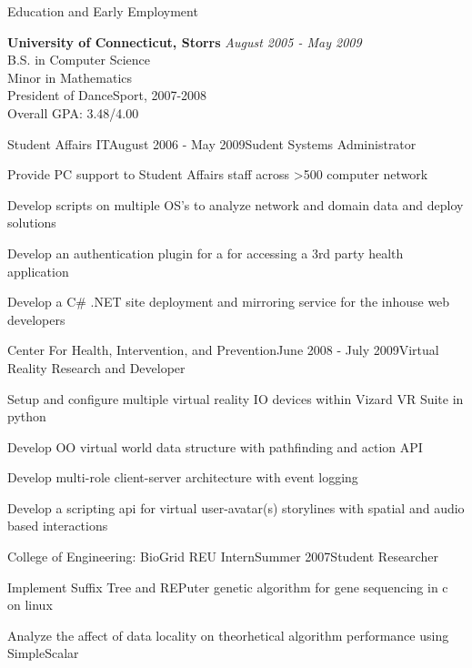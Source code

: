 \documentclass{resume} %
\begin{document}
\begin{rSection}{Education and Early Employment}

{\bf University of Connecticut, Storrs} \hfill {\em August 2005 - May 2009} \\ 
B.S. in Computer Science \\
Minor in Mathematics \smallskip \\
President of DanceSport, 2007-2008 \\
Overall GPA: 3.48/4.00 

\begin{rSubsection}{Student Affairs IT}{August 2006 - May 2009}{Sudent Systems Administrator}{}
\setlength{\itemindent}{1em}
\item Provide PC support to Student Affairs staff across \textgreater500 computer network
\item Develop scripts on multiple OS's to analyze network and domain data and deploy solutions
\item Develop an authentication plugin for a for accessing a 3rd party health application
\item Develop a C\# .NET site deployment and mirroring service for the inhouse web developers
\end{rSubsection}

\begin{rSubsection}{Center For Health, Intervention, and Prevention}{June 2008 - July 2009}{Virtual Reality Research and Developer}{}
\setlength{\itemindent}{1em}
\item Setup and configure multiple virtual reality IO devices within Vizard VR Suite in python
\item Develop OO virtual world data structure with pathfinding and action API
\item Develop multi-role client-server architecture with event logging
\item Develop a scripting api for virtual user-avatar(s) storylines with spatial and audio based interactions
\end{rSubsection}

\begin{rSubsection}{College of Engineering: BioGrid REU Intern}{Summer 2007}{Student Researcher}{}
\setlength{\itemindent}{1em}
\item Implement Suffix Tree and REPuter genetic algorithm for gene sequencing in c on linux
\item Analyze the affect of data locality on theorhetical algorithm performance using SimpleScalar
\end{rSubsection}


\end{rSection}
\end{document}
